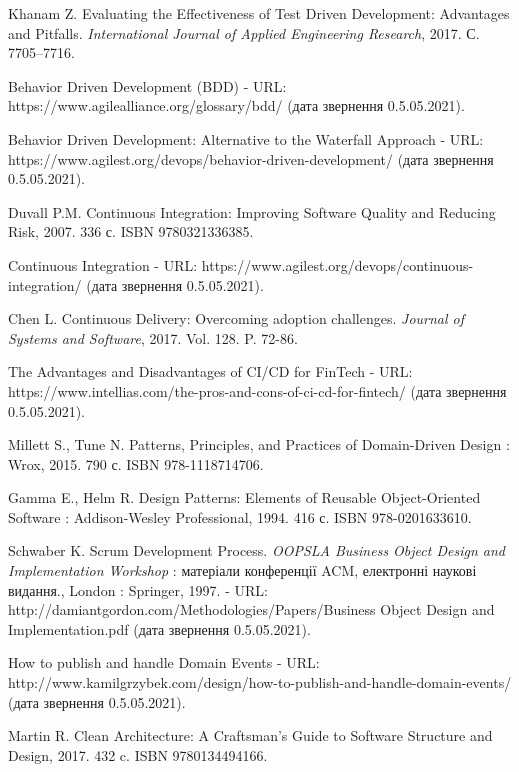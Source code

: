 \begin{thebibliography}{00}
			Khanam Z.
			Evaluating the Effectiveness of Test Driven Development: Advantages and Pitfalls.
      \emph{International Journal of Applied Engineering Research},
      2017. С. 7705–7716.
	
			Behavior Driven Development (BDD) -
			URL: https://www.agilealliance.org/glossary/bdd/
			(дата звернення 0.5.05.2021).

			Behavior Driven Development: Alternative to the Waterfall Approach -
			URL: https://www.agilest.org/devops/behavior-driven-development/
			(дата звернення 0.5.05.2021).
	
			Duvall P.M. 
			Continuous Integration: Improving Software Quality and Reducing Risk,
			2007. 336 с. ISBN 9780321336385.
	
			Continuous Integration -
			URL: https://www.agilest.org/devops/continuous-integration/
			(дата звернення 0.5.05.2021).

      Chen L.
      Continuous Delivery: Overcoming adoption challenges.
      \emph{Journal of Systems and Software},
      2017. Vol. 128. P. 72-86.

      The Advantages and Disadvantages of CI/CD for FinTech -
      URL: https://www.intellias.com/the-pros-and-cons-of-ci-cd-for-fintech/
			(дата звернення 0.5.05.2021).

      Millett S., Tune N.
      Patterns, Principles, and Practices of Domain-Driven Design : Wrox,
      2015. 790 с. ISBN 978-1118714706.

      Gamma E., Helm R.
      Design Patterns: Elements of Reusable Object-Oriented Software : Addison-Wesley Professional,
      1994. 416 с. ISBN 978-0201633610.

			Schwaber K.
      Scrum Development Process.
      \emph{OOPSLA Business Object Design and Implementation Workshop} :
      матеріали конференції ACM, електронні наукові видання.,
      London : Springer, 1997.
      - URL: http://damiantgordon.com/Methodologies/Papers/Business Object Design and Implementation.pdf
			(дата звернення 0.5.05.2021).
	
			How to publish and handle Domain Events -
			URL: http://www.kamilgrzybek.com/design/how-to-publish-and-handle-domain-events/
			(дата звернення 0.5.05.2021).

			Martin R.
			Clean Architecture: A Craftsman's Guide to Software Structure and Design,
			2017. 432 c. ISBN 9780134494166.
	

\end{thebibliography}
